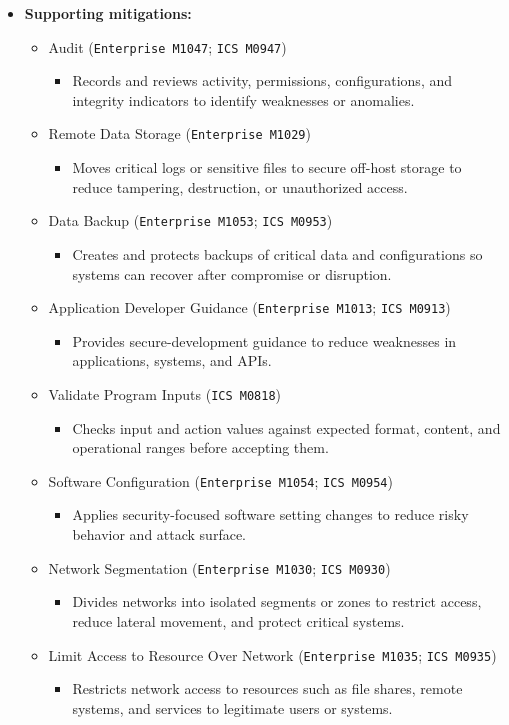 \documentclass[10pt,a4paper,oneside]{report}
\begin{document}
\begin{itemize}
\item \textbf{Supporting mitigations:}
\begin{itemize}
\item Audit (\texttt{Enterprise M1047}; \texttt{ICS M0947})
\begin{itemize}
\item Records and reviews activity, permissions, configurations, and integrity indicators to identify weaknesses or anomalies.
\end{itemize}
\item Remote Data Storage (\texttt{Enterprise M1029})
\begin{itemize}
\item Moves critical logs or sensitive files to secure off-host storage to reduce tampering, destruction, or unauthorized access.
\end{itemize}
\item Data Backup (\texttt{Enterprise M1053}; \texttt{ICS M0953})
\begin{itemize}
\item Creates and protects backups of critical data and configurations so systems can recover after compromise or disruption.
\end{itemize}
\item Application Developer Guidance (\texttt{Enterprise M1013}; \texttt{ICS M0913})
\begin{itemize}
\item Provides secure-development guidance to reduce weaknesses in applications, systems, and APIs.
\end{itemize}
\item Validate Program Inputs (\texttt{ICS M0818})
\begin{itemize}
\item Checks input and action values against expected format, content, and operational ranges before accepting them.
\end{itemize}
\item Software Configuration (\texttt{Enterprise M1054}; \texttt{ICS M0954})
\begin{itemize}
\item Applies security-focused software setting changes to reduce risky behavior and attack surface.
\end{itemize}
\item Network Segmentation (\texttt{Enterprise M1030}; \texttt{ICS M0930})
\begin{itemize}
\item Divides networks into isolated segments or zones to restrict access, reduce lateral movement, and protect critical systems.
\end{itemize}
\item Limit Access to Resource Over Network (\texttt{Enterprise M1035}; \texttt{ICS M0935})
\begin{itemize}
\item Restricts network access to resources such as file shares, remote systems, and services to legitimate users or systems.
\end{itemize}
\end{itemize}
\end{itemize}
\end{document}
